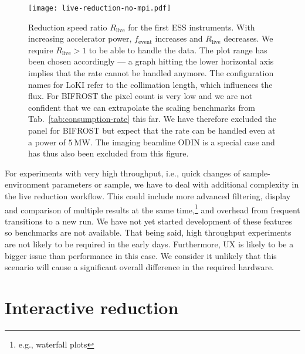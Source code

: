 \documentclass[a4paper,english,numbers=noenddot,bibliography=totoc,chapterprefix=on,DIV=12]{scrartcl}
\newcommand{\Fevent}{f_{\text{event}}}
\newcommand{\bifrost}{BIFROST\xspace}
\newcommand{\loki}{LoKI\xspace}
\newcommand{\odin}{ODIN\xspace}
\begin{document}
\begin{figure}
  \centering
\texttt{[image: live-reduction-no-mpi.pdf]}
\caption{\label{fig:live-reduction-no-mpi}Reduction speed ratio $R_{\text{live}}$ for the first ESS instruments.
With increasing accelerator power, $\Fevent$ increases and $R_{\text{live}}$ decreases.
We require $R_{\text{live}} > 1$ to be able to handle the data.
The plot range has been chosen accordingly --- a graph hitting the lower horizontal axis implies that the rate cannot be handled anymore.
The configuration names for \loki refer to the collimation length, which influences the flux.
For \bifrost the pixel count is very low and we are not confident that we can extrapolate the scaling benchmarks from Tab.~\ref{tab:consumption-rate} this far.
We have therefore excluded the panel for \bifrost but expect that the rate can be handled even at a power of $5~\mathrm{MW}$.
The imaging beamline \odin is a special case and has thus also been excluded from this figure.
}
\end{figure}

For experiments with very high throughput, i.e., quick changes of sample-environment parameters or sample, we have to deal with additional complexity in the live reduction workflow.
This could include more advanced filtering, display and comparison of multiple results at the same time,\footnote{e.g., waterfall plots} and overhead from frequent transitions to a new run.
We have not yet started development of these features so benchmarks are not available.
That being said, high throughput experiments are not likely to be required in the early days.
Furthermore, UX is likely to be a bigger issue than performance in this case.
We consider it unlikely that this scenario will cause a significant overall difference in the required hardware.




\section{Interactive reduction}
\end{document}
